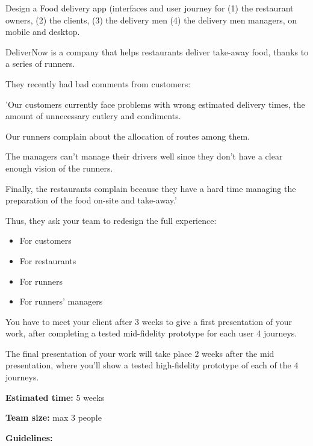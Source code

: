 \makeheaderfiles

Design a Food delivery app (interfaces and user journey for (1) the restaurant owners, (2) the clients, (3) the delivery men (4) the delivery men managers, on mobile and desktop.

DeliverNow is a company that helps restaurants deliver take-away food, thanks to a series of runners.

They recently had bad comments from customers:

'Our customers currently face problems with wrong estimated delivery times, the amount of unnecessary cutlery and condiments.

Our runners complain about the allocation of routes among them.

The managers can't manage their drivers well since they don't have a clear enough vision of the runners.

Finally, the restaurants complain because they have a hard time managing the preparation of the food on-site and take-away.'

Thus, they ask your team to redesign the full experience:

\begin{itemize}
\item For customers
\item For restaurants
\item For runners
\item For runners' managers
\end{itemize}

You have to meet your client after 3 weeks to give a first presentation of your work, after completing a tested mid-fidelity prototype for each user 4 journeys.

The final presentation of your work will take place 2 weeks after the mid presentation, where you'll show a tested high-fidelity prototype of each of the 4 journeys.

\textbf{Estimated time:} 5 weeks

\textbf{Team size:} max 3 people

\textbf{Guidelines:}

